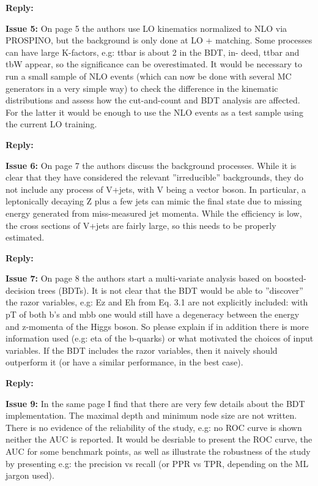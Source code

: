 \documentclass{article}
\begin{document}
\noindent\textbf{Reply:} 

\noindent\textbf{Issue 5:} On page 5 the authors use LO kinematics normalized
to NLO via PROSPINO, but the background is only done at LO + matching. Some
processes can have large K-factors, e.g: ttbar is about 2 in the BDT, in- deed,
ttbar and tbW appear, so the significance can be overestimated. It would be
necessary to run a small sample of NLO events (which can now be done with
several MC generators in a very simple way) to check the difference in the
kinematic distributions and assess how the cut-and-count and BDT analysis are
affected. For the latter it would be enough to use the NLO events as a test
sample using the current LO training.

\noindent\textbf{Reply:} 

\noindent\textbf{Issue 6:} On page 7 the authors discuss the background
processes. While it is clear that they have considered the relevant
”irreducible” backgrounds, they do not include any process of V+jets, with V
being a vector boson. In particular, a leptonically decaying Z plus a few jets
can mimic the final state due to missing energy generated from miss-measured
jet momenta. While the efficiency is low, the cross sections of V+jets are
fairly large, so this needs to be properly estimated.

\noindent\textbf{Reply:} 

\noindent\textbf{Issue 7:} On page 8 the authors start a multi-variate analysis
based on boosted- decision trees (BDTs). It is not clear that the BDT would be
able to ”discover” the razor variables, e.g: Ez and Eh from Eq. 3.1 are not
explicitly included: with pT of both b’s and mbb one would still have a
degeneracy between the energy and z-momenta of the Higgs boson. So please
explain if in addition there is more information used (e.g: eta of the
b-quarks) or what motivated the choices of input variables. If the BDT includes
the razor variables, then it naively should outperform it (or have a similar
performance, in the best case).

\noindent\textbf{Reply:} 

\noindent\textbf{Issue 9:} In the same page I find that there are very few details about the BDT
implementation. The maximal depth and minimum node size are not written. There
is no evidence of the reliability of the study, e.g: no ROC curve is shown
neither the AUC is reported. It would be desriable to present the ROC curve,
the AUC for some benchmark points, as well as illustrate the robustness of the
study by presenting e.g: the precision vs recall (or PPR vs TPR, depending on
the ML jargon used).
\end{document}
